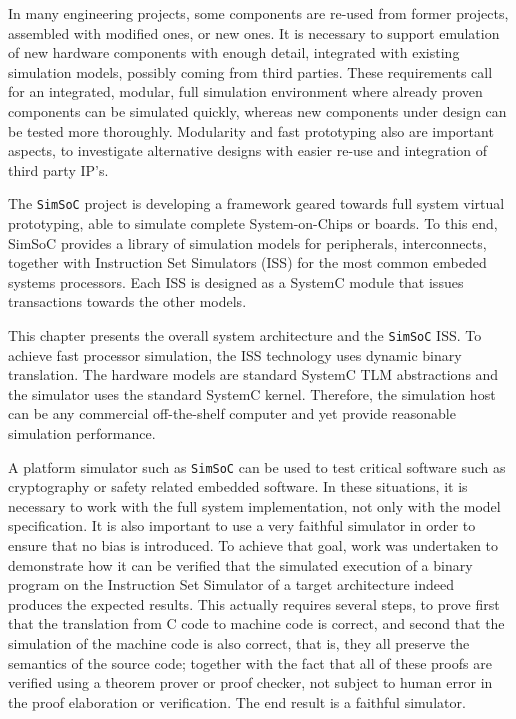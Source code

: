 \documentclass{llncs}
\newcommand{\simsoc}{\texttt{SimSoC}\xspace}
\begin{document}
In many engineering projects, some components are re-used from former
projects, assembled with modified ones, or new ones. It is necessary
to support emulation of new hardware components with enough detail,
integrated with existing simulation models, possibly coming from third
parties.  These requirements call for an integrated, modular, full
simulation environment where already proven components can be
simulated quickly, whereas new components under design can be tested
more thoroughly.  Modularity and fast prototyping also are important
aspects, to investigate alternative designs with easier re-use and
integration of third party IP’s.

The \simsoc project is developing a framework geared towards full
system virtual prototyping, able to simulate complete System-on-Chips
or boards. To this end, SimSoC provides a library of simulation models
for peripherals, interconnects, together with Instruction Set
Simulators (ISS) for the most common embeded systems processors. Each
ISS is designed as a SystemC module that issues transactions towards
the other models.

This chapter presents the overall system architecture and the \simsoc
ISS. To achieve fast processor simulation, the ISS technology uses
dynamic binary translation. The hardware models are standard SystemC
TLM abstractions and the simulator uses the standard SystemC
kernel. Therefore, the simulation host can be any commercial
off-the-shelf computer and yet provide reasonable simulation
performance.

A platform simulator such as \simsoc can be used to test critical
software such as cryptography or safety related embedded software. In
these situations, it is necessary to work with the full system
implementation, not only with the model specification. It is also
important to use a very faithful simulator in order to ensure that no
bias is introduced.  To achieve that goal, work was undertaken to
demonstrate how it can be verified that the simulated execution of a
binary program on the Instruction Set Simulator of a target
architecture indeed produces the expected results. This actually
requires several steps, to prove first that the translation from C
code to machine code is correct, and second that the simulation of the
machine code is also correct, that is, they all preserve the semantics
of the source code; together with the fact that all of these proofs
are verified using a theorem prover or proof checker, not subject to
human error in the proof elaboration or verification. The end result
is a faithful simulator.
\end{document}
